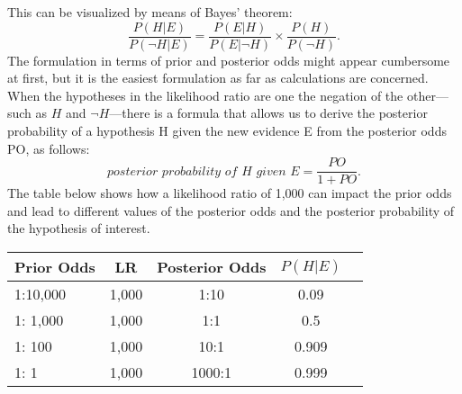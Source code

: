 \documentclass[10pt]{article}
\begin{document}
 

 





 This can be visualized by means of 
Bayes' theorem:
%
\[\frac{P(H|E)}{P(\neg H | E)} = \frac{P(E|H)}{P(E|\neg H)} \times \frac{P(H)}{P(\neg H)}.\]
%
The formulation in terms of prior and posterior odds might appear cumbersome at first, but it is the easiest
formulation as far as calculations are concerned. When the hypotheses in the likelihood ratio are one the negation of the other---such as $H$ and $\neg H$---there 
is a formula that allows us to derive the posterior probability of a hypothesis H given the new evidence E
from the posterior odds PO, as follows:
\[ \textit{posterior probability of H given E} = \frac{PO}{1+PO}.\]
%
%
%
The table below shows how a likelihood ratio of 1,000 can 
impact the prior odds and lead to different values of the 
posterior odds and the posterior 
probability of the hypothesis of interest. 

\vspace{2mm}
\hspace{0.5cm}
\begin{centering}
\begin{tabular}{lcccc}
\hline
Prior Odds & LR  &  Posterior Odds &  $P(H | E)$ \\
\hline
1:10,000 & 1,000 & 1:10 & 0.09  \\
1: 1,000  & 1,000&  1:1 &0.5 \\
1: 100 & 1,000 &  10:1 &  0.909 \\
1: 1 & 1,000 &  1000:1 &  0.999 \\
\hline
\end{tabular}
\end{centering}
\vspace{2mm}
\end{document}
